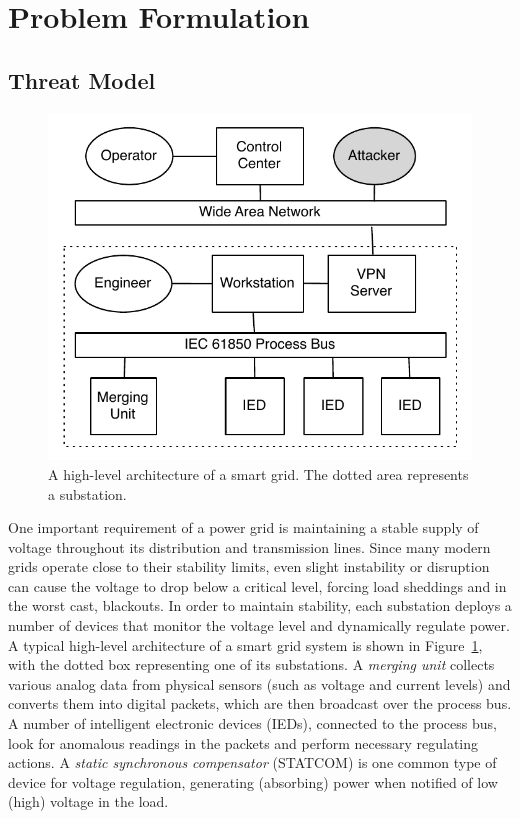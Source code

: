 \section{Problem Formulation}
\label{problemdefinition}
\subsection{Threat Model}
\label{threatmodel}

\begin{figure}[t]
\setlength{\belowcaptionskip}{-15pt}
\centering
\captionsetup[subfigure]{aboveskip=-0.5pt,belowskip=-5pt}
 \includegraphics[width=0.6\columnwidth]{figures/substation-outline}
\caption{\scriptsize{A high-level architecture of a smart grid. The dotted area
  represents a substation.}}
 \label{fig:substation}
\end{figure}

One important requirement of a power grid is maintaining
a stable supply of voltage throughout its distribution and transmission
lines. Since many modern grids operate close to their stability
limits, even slight instability or disruption can cause the voltage to
drop below a critical level, forcing load sheddings and in the worst
cast, blackouts. In order to maintain stability, each substation
deploys a number of devices that monitor the voltage level and
dynamically regulate power. A typical high-level architecture of a
smart grid system is shown in Figure~\ref{fig:substation}, with the
dotted box representing one of its substations. A \textit{merging
  unit} collects various analog data from physical sensors (such as
voltage and current levels) and converts them into digital packets,
which are then broadcast over the process bus. A number of intelligent
electronic devices (IEDs), connected to the process bus, look for
anomalous readings in the packets and perform necessary regulating
actions. A \textit{static synchronous compensator} (STATCOM) is one
common type of device for voltage regulation, generating (absorbing)
power when notified of low (high) voltage in the load.

